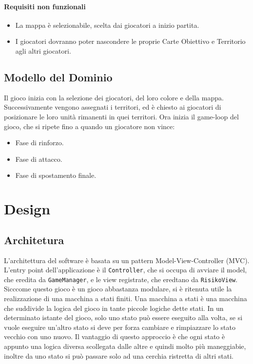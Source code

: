 \documentclass[a4paper,12pt]{report}
\begin{document}
\subsubsection{Requisiti non funzionali}
\begin{itemize}
	\item La mappa è selezionabile, scelta dai giocatori a inizio partita.
	\item I giocatori dovranno poter nascondere le proprie Carte Obiettivo e Territorio agli altri giocatori.
\end{itemize}

\section{Modello del Dominio}

Il gioco inizia con la selezione dei giocatori, del loro colore e della mappa.
Successivamente vengono assegnati i territori, ed è chiesto ai giocatori di posizionare le loro unità rimanenti in quei territori.
Ora inizia il game-loop del gioco, che si ripete fino a quando un giocatore non vince:
\begin{itemize}
	\item Fase di rinforzo.
	\item Fase di attacco.
	\item Fase di spostamento finale.
\end{itemize}


\chapter{Design}

\section{Architetura}

L'architettura del software è basata su un pattern Model-View-Controller (MVC).
L'entry point dell'applicazione è il \texttt{Controller}, che si occupa di avviare il model, che eredita da \texttt{GameManager}, e le view registrate, che eredtano da \texttt{RisikoView}.
Sicccome questo gioco è un gioco abbastanza modulare, si è ritenuta utile la realizzazione di una macchina a stati finiti.
Una macchina a stati è una macchina che suddivide la logica del gioco in tante piccole logiche dette stati. In un determinato istante del gioco, solo uno stato può essere eseguito alla volta, se si vuole eseguire un'altro stato si deve per forza cambiare e rimpiazzare lo stato vecchio con uno nuovo.
Il vantaggio di questo approccio è che ogni stato è appunto una logica diversa scollegata dalle altre e quindi molto più maneggiabie, inoltre da uno stato si può passare solo ad una cerchia ristretta di altri stati.
\end{document}
